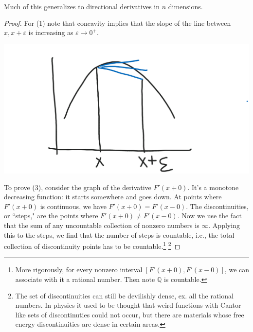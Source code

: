 Much of this generalizes to directional derivatives in $n$ dimensions.
\begin{proof}
For (1) note that concavity implies that the slope of the line between $x,x+\varepsilon$ is increasing as $\varepsilon\to 0^+$.

\begin{center}\includegraphics[scale=.25]{images/2-1}\end{center}

To prove (3), consider the graph of the derivative $F'(x + 0)$. It's a monotone decreasing function: it starts somewhere and goes down. 
At points where $F'(x+0)$ is continuous, we have $F'(x+0)=F'(x-0)$. The discontinuities, or ``steps," are the points where $F'(x+0)\ne F'(x-0)$. Now we use the fact that the sum of any uncountable collection of nonzero numbers is $\infty$. 
Applying this to the steps, we find that the number of steps is countable, i.e., the total collection of discontinuity points has to be countable.\footnote{More rigorously, for every nonzero interval $[F'(x+0),F'(x-0)]$, we can associate with it a rational number. Then note $\mathbb{Q}$ is countable.}
\footnote{The set of discontinuities can still be devilishly dense, ex. all the rational numbers. In physics it used to be thought that weird functions with Cantor-like sets of discontinuties could not occur, but there are materials whose free energy discontinuities are dense in certain areas.}


\end{proof}
